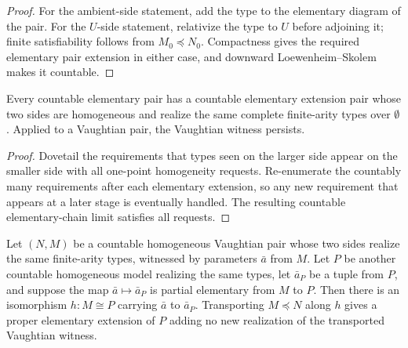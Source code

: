 \begin{proof}
For the ambient-side statement, add the type to the elementary diagram of
the pair.  For the \(U\)-side statement, relativize the type to \(U\)
before adjoining it; finite satisfiability follows from
\(M_0\preceq N_0\).  Compactness gives the required elementary pair
extension in either case, and downward Loewenheim--Skolem makes it
countable.
\end{proof}

\begin{lemma}
\label{lem:homogeneous-vaughtian-pair}
Every countable elementary pair has a countable elementary extension
pair whose two sides are homogeneous and realize the same complete
finite-arity types over \(\emptyset\).  Applied to a Vaughtian pair, the
Vaughtian witness persists.
\end{lemma}

\begin{proof}
Dovetail the requirements that types seen on the larger side appear on
the smaller side with all one-point homogeneity requests.  Re-enumerate
the countably many requirements after each elementary extension, so any
new requirement that appears at a later stage is eventually handled.
The resulting countable elementary-chain limit satisfies all requests.
\end{proof}

\begin{lemma}
\label{lem:vaughtian-pair-copy-over-parameters}
Let \((N,M)\) be a countable homogeneous Vaughtian pair whose two sides
realize the same finite-arity types, witnessed by parameters \(\bar a\)
from \(M\).  Let \(P\) be another countable homogeneous model realizing
the same types, let \(\bar a_P\) be a tuple from \(P\), and suppose the
map \(\bar a\mapsto\bar a_P\) is partial elementary from \(M\) to \(P\).
Then there is an isomorphism \(h:M\cong P\) carrying \(\bar a\) to
\(\bar a_P\).  Transporting \(M\preceq N\) along \(h\) gives a proper
elementary extension of \(P\) adding no new realization of the
transported Vaughtian witness.
\end{lemma}

